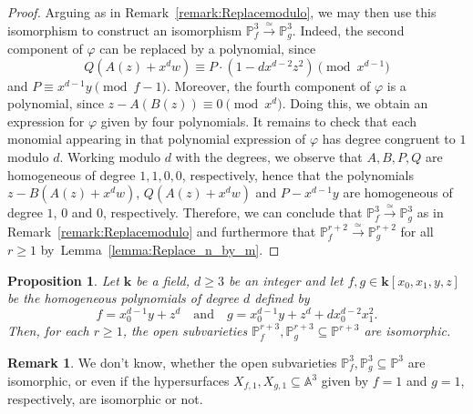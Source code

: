 \documentclass[JEP,XML,SOM,Unicode,NoFloatCountersInSection,published]{cedram}
\newcommand\quand{\quad\text{and}\quad}
\newtheorem{proposition}[lemma]{Proposition}
\theoremstyle{definition}
\newtheorem{remark}[lemma]{Remark}
\newcommand\iso{\stackrel{\simeq}{\longrightarrow}}
\newcommand\A{{\mathbb A}}\let\AA\A
\renewcommand\k{{\mathbf k}}
\newcommand\p{{\mathbb P}}\let\PP\p
\newcommand{\kk}{\mathbf{k}}
\begin{document}
\begin{proof}
Arguing as in Remark~\ref{remark:Replacemodulo}, we may then use this isomorphism to construct an isomorphism $\p^3_f\iso \p^3_g$. Indeed, the second component of $\varphi$ can be replaced by a polynomial, since
\[
Q\left(A(z)+x^{d}w\right)\equiv P\cdot (1-dx^{d-2}z^2)\pmod{x^{d-1}}
\]
and $P\equiv x^{d-1}y\pmod{f-1}$.
Moreover, the fourth component of $\varphi$ is a polynomial, since $z-A(B(z)) \equiv 0\pmod{x^d}$.
Doing this, we obtain an expression for $\varphi$ given by four polynomials. It remains to check that each monomial appearing in that polynomial expression of $\varphi$ has degree congruent to $1$ modulo $d$. Working modulo $d$ with the degrees, we observe that $A,B,P,Q$ are homogeneous of degree $1,1,0,0$, respectively, hence that the polynomials $z-B(A(z)+x^{d}w)$, $Q(A(z)+x^dw)$ and $P-x^{d-1}y$ are homogeneous of degree $1$, $0$ and $0$, respectively. Therefore, we can conclude that $\p^3_f\iso \p^3_g$ as in Remark~\ref{remark:Replacemodulo} and furthermore that $\p^{r+2}_f\iso \p^{r+2}_g$ for all $r\geq 1$ by~Lemma~\ref{lemma:Replace_n_by_m}.
\end{proof}

\begin{proposition}
\label{Prop.Counterexample.dim4}
Let $\kk$ be a field, $d\ge 3$ be an integer and let $f,g\in\k[x_0,x_1,y,z]$ be the homogeneous polynomials of degree $d$ defined by
\[
f=x_0^{d-1}y+z^{d} \quand
g=x_0^{d-1}y+z^{d}+dx_0^{d-2}x_1^2. \]
Then, for each $r\ge 1$, the open subvarieties $\p^{r+3}_f,\p^{r+3}_g \subseteq \p^{r+3}$ are isomorphic.
\end{proposition}

\begin{remark}
We don't know, whether the open subvarieties $\p^{3}_f,\p^{3}_g \subseteq \p^{3}$ are isomorphic,
or even if the hypersurfaces $X_{f,1}, X_{g,1}\subseteq \A^3$ given by $f=1$ and $g=1$, respectively, are isomorphic or not.
\end{remark}
\end{document}
